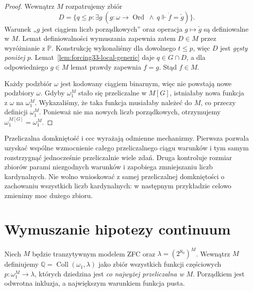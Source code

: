 \begin{proof}
Wewnątrz $M$ rozpatrujemy zbiór
\[
 D=\{q\leq p:\exists g\
   (g:\omega\to\operatorname{Ord}
       \ \land\ q\Vdash\dot f=\check g)\}.
\]
Warunek „$g$ jest ciągiem
liczb porządkowych” oraz operacja
$g\mapsto\check g$ są definiowalne
w $M$. Lemat definiowalności
wymuszania zapewnia zatem
$D\in M$ przez wyróżnianie
z $\mathbb P$. Konstrukcję
wykonaliśmy dla dowolnego
$t\leq p$, więc $D$ jest
\emph{gęsty poniżej $p$}.
Lemat~\ref{lem:forcing33-local-generic}
daje $q\in G\cap D$, a dla
odpowiedniego $g\in M$ lemat prawdy
zapewnia $f=g$. Stąd $f\in M$.

Każdy podzbiór $\omega$
jest kodowany ciągiem binarnym,
więc nie powstają nowe podzbiory
$\omega$. Gdyby $\omega_1^M$
stało się przeliczalne w $M[G]$,
istniałaby nowa funkcja
z $\omega$ na $\omega_1^M$.
Wykazaliśmy, że taka funkcja
musiałaby należeć do $M$,
co przeczy definicji $\omega_1^M$.
Ponieważ nie ma nowych liczb
porządkowych, otrzymujemy
$\omega_1^{M[G]}=\omega_1^M$.
\end{proof}

\begin{uwaga}
\label{rem:forcing34-two-properties}
Przeliczalna domkniętość i ccc
wyrażają odmienne mechanizmy.
Pierwsza pozwala uzyskać wspólne
wzmocnienie całego przeliczalnego
ciągu warunków i tym samym
rozstrzygnąć jednocześnie
przeliczalnie wiele zdań.
Druga kontroluje rozmiar zbiorów
parami niezgodnych warunków
i zapobiega zmniejszaniu liczb
kardynalnych. Nie wolno
wnioskować z samej przeliczalnej
domkniętości o zachowaniu
wszystkich liczb kardynalnych:
w następnym przykładzie
celowo zmienimy moc dużego zbioru.
\end{uwaga}

\section{Wymuszanie hipotezy continuum}

\begin{definicja}
\label{def:forcing34-collapse}
Niech $M$ będzie tranzytywnym
modelem ZFC oraz
$\lambda=(2^{\aleph_0})^M$.
Wewnątrz $M$ definiujemy
$\mathbb Q=\operatorname{Coll}(\omega_1,\lambda)$
jako zbiór wszystkich funkcji częściowych
$p:\omega_1^M\longrightarrow\lambda$,
których dziedzina jest
\emph{co najwyżej przeliczalna w $M$}.
Porządkiem jest odwrotna inkluzja,
a największym warunkiem funkcja pusta.
\end{definicja}


